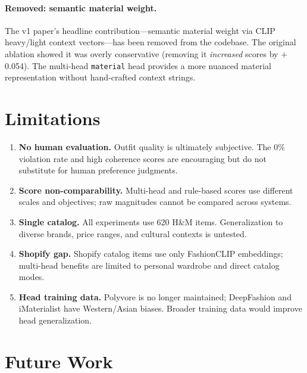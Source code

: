 \documentclass[10pt,twocolumn]{article}
\begin{document}
\paragraph{Removed: semantic material weight.}
The v1 paper's headline contribution---semantic material weight via CLIP
heavy/light context vectors---has been removed from the codebase.  The
original ablation showed it was overly conservative (removing it
\emph{increased} scores by $+$0.054).  The multi-head \texttt{material}
head provides a more nuanced material representation without hand-crafted
context strings.

\section{Limitations}
\label{sec:limitations}

\begin{enumerate}[leftmargin=*,topsep=2pt,itemsep=1pt]
\item \textbf{No human evaluation.}  Outfit quality is ultimately
  subjective.  The 0\% violation rate and high coherence scores are
  encouraging but do not substitute for human preference judgments.
\item \textbf{Score non-comparability.}  Multi-head and rule-based scores
  use different scales and objectives; raw magnitudes cannot be compared
  across systems.
\item \textbf{Single catalog.}  All experiments use 620 H\&M items.
  Generalization to diverse brands, price ranges, and cultural contexts
  is untested.
\item \textbf{Shopify gap.}  Shopify catalog items use only FashionCLIP
  embeddings; multi-head benefits are limited to personal wardrobe and
  direct catalog modes.
\item \textbf{Head training data.}  Polyvore is no longer maintained;
  DeepFashion and iMaterialist have Western/Asian biases.  Broader
  training data would improve head generalization.
\end{enumerate}

\section{Future Work}
\label{sec:future}
\end{document}

